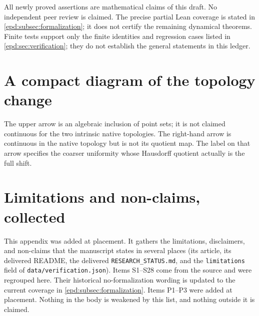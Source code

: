 \documentclass[11pt,a4paper]{article}
\numberwithin{equation}{section}
\theoremstyle{plain}
\theoremstyle{definition}
\theoremstyle{remark}
\newcommand{\Ik}{I_\kappa}
\newcommand{\BI}{\mathcal B_{\mathrm{int}}}
\begin{document}
All newly proved assertions are mathematical claims of this draft.
No independent peer review is claimed. The precise partial Lean coverage
is stated in \cref{epd:subsec:formalization}; it does not certify the
remaining dynamical theorems.
Finite tests support only the finite identities and regression cases
listed in \cref{epd:sec:verification}; they do not establish the general
statements in this ledger.

\section{A compact diagram of the topology change}
\label{epd:app:diagram}
\begin{center}
\end{center}
The upper arrow is an algebraic inclusion of point sets; it is not
claimed continuous for the two intrinsic native topologies. The
right-hand arrow is continuous in the native topology but is not its
quotient map. The label on that arrow specifies the coarser uniformity
whose Hausdorff quotient actually is the full shift.

\section{Limitations and non-claims, collected}
\label{epd:app:nonclaims}
This appendix was added at placement. It gathers the limitations,
disclaimers, and non-claims that the manuscript states in several places
(its article, its delivered README, the delivered
\texttt{RESEARCH\_STATUS.md}, and the \texttt{limitations} field of
\texttt{data/verification.json}). Items S1--S28 come from the source and
were regrouped here. Their historical no-formalization wording is updated
to the current coverage in \cref{epd:subsec:formalization}.
Items P1--P3 were added at placement. Nothing in
the body is weakened by this list, and nothing outside it is claimed.
\end{document}
